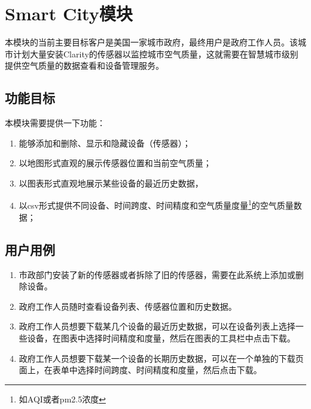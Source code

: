 \section{Smart City模块}
本模块的当前主要目标客户是美国一家城市政府，最终用户是政府工作人员。该城市计划大量安装Clarity的传感器以监控城市空气质量，这就需要在智慧城市级别提供空气质量的数据查看和设备管理服务。
\subsection{功能目标}
本模块需要提供一下功能：
\begin{enumerate}
  \item 能够添加和删除、显示和隐藏设备（传感器）；
  \item 以地图形式直观的展示传感器位置和当前空气质量；
  \item 以图表形式直观地展示某些设备的最近历史数据，
  \item 以csv形式提供不同设备、时间跨度、时间精度和空气质量度量\footnote{如AQI或者pm2.5浓度}的空气质量数据；
\end{enumerate}

\subsection{用户用例}
\begin{enumerate}
  \item 市政部门安装了新的传感器或者拆除了旧的传感器，需要在此系统上添加或删除设备。
  \item 政府工作人员随时查看设备列表、传感器位置和历史数据。
  \item 政府工作人员想要下载某几个设备的最近历史数据，可以在设备列表上选择一些设备，在图表中选择时间精度和度量，然后在图表的工具栏中点击下载。
  \item 政府工作人员想要下载某一个设备的长期历史数据，可以在一个单独的下载页面上，在表单中选择时间跨度、时间精度和度量，然后点击下载。
\end{enumerate}

